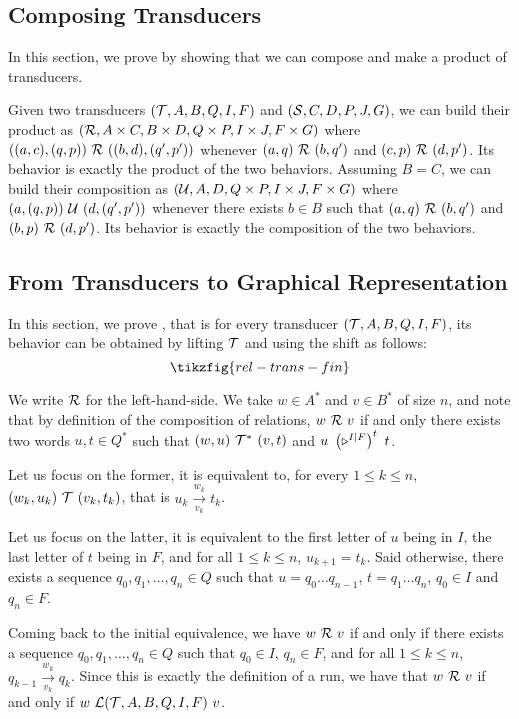 
\subsection{Composing Transducers}\label{app:transducer-category}

In this section, we prove  by showing that we can compose and make a product of transducers. 

Given two transducers $(\T,A,B,Q,I,F)$ and $(\S,C,D,P,J,G)$, we can build their product as $(\R,A \times C,B \times D,Q \times P, I \times J, F \times G)$ where $((a,c),(q,p))~\R~((b,d),(q',p'))$ whenever $(a,q)~\R~(b,q')$ and $(c,p)~\R~(d,p')$. Its behavior is exactly the product of the two behaviors. 
Assuming $B=C$, we can build their composition as $(\U,A,D,Q \times P,I \times J, F \times G)$ where  $(a,(q,p))~\U~(d,(q',p'))$ whenever there exists $b \in B$ such that  $(a,q)~\R~(b,q')$ and $(b,p)~\R~(d,p')$.	 Its behavior is exactly the composition of the two behaviors.

\subsection{From Transducers to Graphical Representation}\label{app:transducer-fin}

In this section, we prove , that is for every transducer $(\T, A, B, Q, I,F)$, its behavior can be obtained by lifting $\T$ and using the shift as follows:
\[ \tikzfig{rel-trans-fin} \]

	We write $\R$ for the left-hand-side. We take $w \in A^*$ and $v \in B^*$ of size $n$, and note that by definition of the composition of relations, $w~\R~v$ if and only there exists two words $u,t \in Q^*$ such that $(w,u)~\T^*~(v,t)$ and $u~\transpose{\left(\shift{I}{F}\right)}~t$. 
	
	Let us focus on the former, it is equivalent to, for every $1 \leq k \leq n$, $(w_k,u_k)~\T~(v_k,t_k)$, that is $u_k \xrightarrow[v_k]{w_k} t_k$.
	
	Let us focus on the latter, it is equivalent to the first letter of $u$ being in $I$, the last letter of $t$ being in $F$, and for all $1 \leq k \leq n$, $u_{k+1} = t_k$. Said otherwise, there exists a sequence $q_0,q_1,\dots,q_n \in Q$ such that $u = q_0\dots q_{n-1}$, $t = q_1\dots q_n$, $q_0 \in I$ and $q_n \in F$.
	
	Coming back to the initial equivalence, we have $w~\R~v$ if and only if there exists a sequence $q_0,q_1,\dots,q_n \in Q$ such that $q_0 \in I$, $q_n \in F$, and for all $1 \leq k \leq n$, $q_{k-1} \xrightarrow[v_k]{w_k} q_k$. Since this is exactly the definition of a run, we have that $w~\R~v$ if and only if $w~\L(\T,A,B,Q,I,F)~v$.

